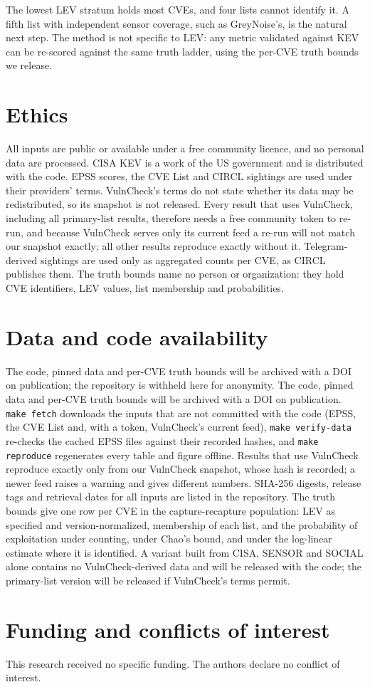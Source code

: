 The lowest LEV stratum holds most CVEs, and four lists cannot identify it. A
fifth list with independent sensor coverage, such as GreyNoise's, is the
natural next step. The method is not specific to LEV: any metric validated
against KEV can be re-scored against the same truth ladder, using the per-CVE
truth bounds we release.

\section*{Ethics}

All inputs are public or available under a free community licence, and no
personal data are processed. CISA KEV is a work of the US government and is
distributed with the code. EPSS scores, the CVE List and CIRCL sightings are
used under their providers' terms. VulnCheck's terms do not state whether its
data may be redistributed, so its snapshot is not released. Every result that
uses VulnCheck, including all primary-list results, therefore needs a free
community token to re-run, and because VulnCheck serves only its current feed
a re-run will not match our snapshot exactly; all other results reproduce
exactly without it. Telegram-derived sightings are used only as aggregated
counts per CVE, as CIRCL publishes them. The truth bounds name no
person or organization: they hold CVE identifiers, LEV values, list membership
and probabilities.

\section*{Data and code availability}\label{sec:availability}

\ifanon
The code, pinned data and per-CVE truth bounds will be archived with a DOI on
publication; the repository is withheld here for anonymity.
\else
The code, pinned data and per-CVE truth bounds will be archived with a DOI on
publication.
\fi
\texttt{make fetch} downloads the inputs that are not committed with the code
(EPSS, the CVE List and, with a token, VulnCheck's current feed),
\texttt{make verify-data} re-checks the cached EPSS files against their
recorded hashes, and \texttt{make reproduce} regenerates every table and
figure offline. Results that use VulnCheck reproduce exactly only from our
VulnCheck snapshot, whose hash is recorded; a newer feed raises a warning and
gives different numbers. SHA-256 digests, release tags and
retrieval dates for all inputs are listed in the repository. The truth bounds
give one row per CVE in the capture-recapture population: LEV as specified and
version-normalized, membership of each list, and the probability of exploitation
under counting, under Chao's bound, and under the log-linear estimate where it
is identified. A variant built from CISA, SENSOR and SOCIAL alone contains no
VulnCheck-derived data and will be released with the code; the primary-list version will be released if VulnCheck's
terms permit.

\ifanon\else
\section*{Funding and conflicts of interest}
This research received no specific funding. The authors declare no conflict
of interest.
\fi
